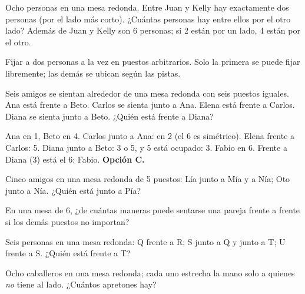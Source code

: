 \begin{ejemplo}
Ocho personas en una mesa redonda. Entre Juan y Kelly hay exactamente dos personas (por el lado más corto). ¿Cuántas
personas hay entre ellos por el otro lado?
\solucion Además de Juan y Kelly son 6 personas; si 2 están por un lado, 4 están por el otro.
\end{ejemplo}

\begin{trampa}
Fijar a dos personas a la vez en puestos arbitrarios. Solo la primera se puede fijar libremente; las demás se ubican
según las pistas.
\end{trampa}

\begin{reto}
Seis amigos se sientan alrededor de una mesa redonda con seis puestos iguales. Ana está frente a Beto. Carlos se sienta
junto a Ana. Elena está frente a Carlos. Diana se sienta junto a Beto. ¿Quién está frente a Diana?
\end{reto}

\begin{retoresuelto}
Ana en 1, Beto en 4. Carlos junto a Ana: en 2 (el 6 es simétrico). Elena frente a Carlos: 5. Diana junto a Beto: 3 o 5,
y 5 está ocupado: 3. Fabio en 6. Frente a Diana (3) está el 6: Fabio. \textbf{Opción C.}
\end{retoresuelto}

\taller
{}
\begin{ejercicios}
\item Cinco amigos en una mesa redonda de 5 puestos: Lía junto a Mía y a Nía; Oto junto a Nía. ¿Quién está junto a Pía? 
\item En una mesa de 6, ¿de cuántas maneras puede sentarse una pareja frente a frente si los demás puestos no importan? 
\end{ejercicios}
\begin{ejercicios}
\item Seis personas en una mesa redonda: Q frente a R; S junto a Q y junto a T; U frente a S. ¿Quién está frente a T?
\item Ocho caballeros en una mesa redonda; cada uno estrecha la mano solo a quienes \emph{no} tiene al lado. ¿Cuántos apretones hay?
\end{ejercicios}

